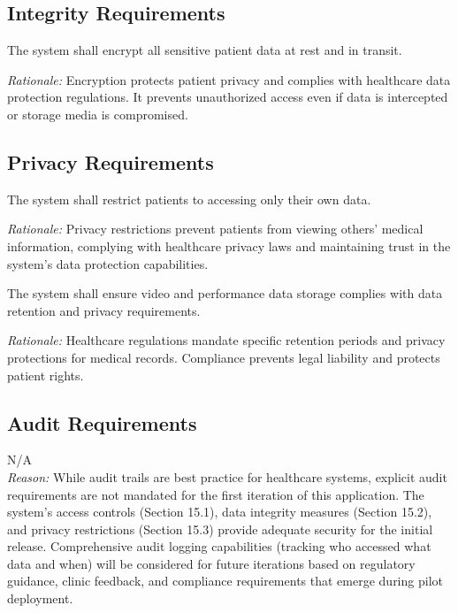 \documentclass[12pt]{article}
\newcommand{\rationale}[1]{\par\emph{Rationale:} #1}
\begin{document}
\subsection{Integrity Requirements}
\begin{reqlist}
	\item[SR-IR 1.] The system shall encrypt all sensitive patient data at rest and in transit.
	\rationale{Encryption protects patient privacy and complies with healthcare data protection regulations. It prevents unauthorized access even if data is intercepted or storage media is compromised.}
\end{reqlist}

\subsection{Privacy Requirements}
\begin{reqlist}
	\item[SR-PR 1.] The system shall restrict patients to accessing only their own data.
	\rationale{Privacy restrictions prevent patients from viewing others' medical information, complying with healthcare privacy laws and maintaining trust in the system's data protection capabilities.}
	
	\item[SR-PR 2.] The system shall ensure video and performance data storage complies with data retention and privacy requirements.
	\rationale{Healthcare regulations mandate specific retention periods and privacy protections for medical records. Compliance prevents legal liability and protects patient rights.}
\end{reqlist}

\subsection{Audit Requirements}
\noindent N/A \\
\textit{Reason:} While audit trails are best practice for healthcare systems, explicit audit requirements are not mandated for the first iteration of this application. The system's access controls (Section 15.1), data integrity measures (Section 15.2), and privacy restrictions (Section 15.3) provide adequate security for the initial release. Comprehensive audit logging capabilities (tracking who accessed what data and when) will be considered for future iterations based on regulatory guidance, clinic feedback, and compliance requirements that emerge during pilot deployment.
\end{document}
